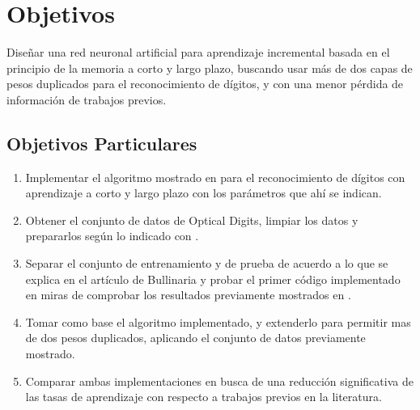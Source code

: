 \section{Objetivos}
    Diseñar una red neuronal artificial para aprendizaje incremental basada en el principio de la memoria a corto y largo plazo, buscando usar más de dos capas de pesos duplicados para el reconocimiento de dígitos, y con una menor p\'erdida de información de trabajos previos.
    \subsection{Objetivos Particulares}
        \begin{enumerate}
            \item Implementar el algoritmo mostrado en \cite{bullinaria2009} para el reconocimiento de dígitos con aprendizaje a corto y largo plazo con los parámetros que ahí se indican.
            \item Obtener el conjunto de datos de Optical Digits, limpiar los datos y prepararlos según lo indicado con \cite{bullinaria2009}.
            \item Separar el conjunto de entrenamiento y de prueba de acuerdo a lo que se explica en el artículo de Bullinaria y probar el primer código implementado en miras de comprobar los resultados previamente mostrados en \cite{bullinaria2009}.
            \item Tomar como base el algoritmo implementado, y extenderlo para permitir mas de dos pesos duplicados, aplicando el conjunto de datos previamente mostrado.
            \item Comparar ambas implementaciones en busca de una reducción significativa de las tasas de aprendizaje con respecto a trabajos previos en la literatura.
        \end{enumerate}